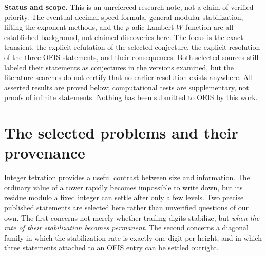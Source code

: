 \documentclass[11pt,letterpaper]{article}
\numberwithin{equation}{section}
\theoremstyle{definition}
\theoremstyle{remark}
\newcommand{\panel}[1]{\noindent\colorbox{pale}{\parbox{0.95\textwidth}{\small #1}}}
\begin{document}
\begin{titlepage}
\begin{abstract}
A second, complementary theorem concerns the diagonal family in which the tower base is one less than the radix. For even $B\ge4$, tower base $a=B-1$, every height $h\ge0$ and every gap $r\ge1$,
\[
 T_{h+r}(a)-T_h(a)\equiv-2B^h\pmod{B^{h+1}},
\]
so exactly one further base-$B$ digit becomes permanent at each height. This resolves the three conjectural comments in OEIS A324017: two are true, while the third fails in every nondegenerate case, the smallest witness being $3\uparrow\uparrow2=27\not\equiv59\equiv3\uparrow\uparrow3\pmod{64}$. We give complete proofs, the exact prime-adic distance between any two heights, uniqueness and compatibility of the modular fixed points, an exact digit-lifting algorithm with a per-digit formula, a restricted general-radix extension, modular saturation across arbitrarily high Knuth arrow ranks, and a sign-sensitive local $p$-adic Lambert $W$ description of the limit. The accompanying dependency-free Python package runs both verification suites and passes 183,204 exact assertions.
\end{abstract}
\vfill
\panel{%
\textbf{Status and scope.} This is an unrefereed research note, not a claim of verified priority. The eventual decimal speed formula, general modular stabilization, lifting-the-exponent methods, and the $p$-adic Lambert $W$ function are all established background, not claimed discoveries here. The focus is the exact transient, the explicit refutation of the selected conjecture, the explicit resolution of the three OEIS statements, and their consequences. Both selected sources still labeled their statements as conjectures in the versions examined, but the literature searches do not certify that no earlier resolution exists anywhere. All asserted results are proved below; computational tests are supplementary, not proofs of infinite statements. Nothing has been submitted to OEIS by this work.}
\end{titlepage}

\tableofcontents
\newpage

\section{The selected problems and their provenance}\label{sec:problem}

Integer tetration provides a useful contrast between size and information. The ordinary value of a tower rapidly becomes impossible to write down, but its residue modulo a fixed integer can settle after only a few levels. Two precise published statements are selected here rather than unverified questions of our own. The first concerns not merely whether trailing digits stabilize, but \emph{when the rate of their stabilization becomes permanent}. The second concerns a diagonal family in which the stabilization rate is exactly one digit per height, and in which three statements attached to an OEIS entry can be settled outright.
\end{document}
